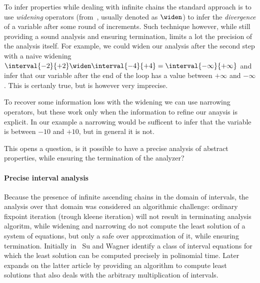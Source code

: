 To infer properties while dealing with infinite chains the standard
approach is to use \emph{widening} operators
(from~\cite{10.1007/3-540-55844-6_142}, usually denoted as \(\widen\))
to infer the \emph{divergence} of a variable after some round of
increments. Such technique however, while still providing a sound
analysis and ensuring termination, limits a lot the precision of the
analysis itself. For example, we could widen our analysis after the
second step with a naive widening
\(\interval{-2}{+2} \widen \interval{-4}{+4} =
\interval{-\infty}{+\infty}\) and infer that our variable after the
end of the loop has a value between \(+\infty\) and \(-\infty\). This
is certanly true, but is however very imprecise.

To recover some information loss with the widening we can use
narrowing operators, but these work only when the information to
refine our anaysis is explicit. In our example a narrowing would be
sufficent to infer that the variable is between \(-10\) and \(+10\),
but in general it is not.

This opens a question, is it possible to have a precise analysis of
abstract properties, while ensuring the termination of the analyzer?

\paragraph*{Precise interval analysis} Because the presence of
infinite ascending chains in the domain of intervals, the analysis
over that domain was considered an algorithmic challenge: ordinary
fixpoint iteration (trough kleene iteration) will not result in
terminating analysis algoritm, while widening and narrowing do not
compute the least solution of a system of equations, but only a safe
over approximation of it, while ensuring termination. Initially
in~\cite{SU2005122} Su and Wagner identify a class of interval
equations for which the least solution can be computed precisely in
polinomial time. Later~\cite{Gawlitza2009} expands on the latter
article by providing an algorithm to compute least solutions that also
deals with the arbitrary multiplication of intervals.

